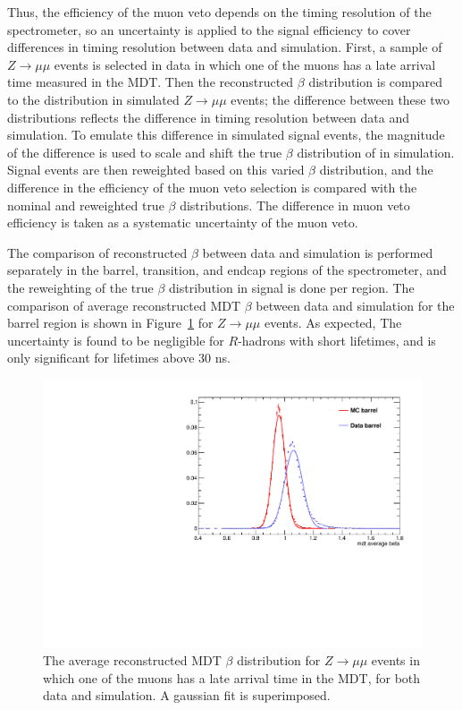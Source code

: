 Thus, the efficiency of the muon veto depends on the timing resolution of the spectrometer, so an uncertainty is applied to the signal efficiency to cover differences in timing resolution between data and simulation. 
First, a sample of $Z\rightarrow\mu\mu$ events is selected in data in which one of the muons has a late arrival time measured in the \ac{MDT}. 
Then the reconstructed $\beta$ distribution is compared to the distribution in simulated $Z\rightarrow\mu\mu$ events; the difference between these two distributions reflects the difference in timing resolution between data and simulation.
To emulate this difference in simulated signal events, the magnitude of the difference is used to scale and shift the true $\beta$ distribution of \rhadrons in simulation. 
Signal events are then reweighted based on this varied $\beta$ distribution, and the difference in the efficiency of the muon veto selection is compared with the nominal and reweighted true $\beta$ distributions. 
The difference in muon veto efficiency is taken as a systematic uncertainty of the muon veto. 
 
The comparison of reconstructed $\beta$ between data and simulation is performed separately in the barrel, transition, and endcap regions of the spectrometer, and the reweighting of the true $\beta$ distribution in signal is done per region. 
The comparison of average reconstructed \ac{MDT} $\beta$ between data and simulation for the barrel region is shown in Figure~\ref{fig:mdt_beta} for $Z\rightarrow\mu\mu$ events.
As expected, The uncertainty is found to be negligible for $R$-hadrons with short lifetimes, and is only significant for lifetimes above 30 ns.

\begin{figure}[hbtp]
\centering
\includegraphics[width=\fullfig]{figures/beta_muonveto.pdf}
\caption{The average reconstructed MDT $\beta$ distribution for $Z\rightarrow\mu\mu$ events in which one of the muons has a late arrival time in the \ac{MDT}, for both data and simulation. A gaussian fit is superimposed.}
\label{fig:mdt_beta}
\end{figure}

